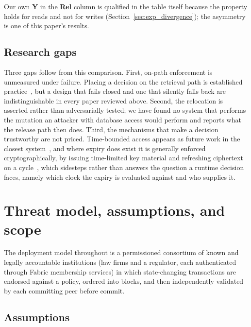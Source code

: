 \documentclass[preprint,12pt]{elsarticle}
\begin{document}
Our own \textbf{Y} in the \textbf{Rel} column is qualified in the table itself
because the property holds for reads and not for writes
(Section~\ref{sec:exp_divergence}); the asymmetry is one of this paper's
results.

\subsection{Research gaps}
\label{sec:gaps}

Three gaps follow from this comparison. First, on-path enforcement is
unmeasured under failure. Placing a decision on the retrieval path is
established practice~\cite{steichen2018blockchain,liu2026rbacipfs}, but a
design that fails closed and one that silently falls back are indistinguishable
in every paper reviewed above. Second, the relocation is asserted rather than
adversarially tested; we have found no system that performs the mutation an
attacker with database access would perform and reports what the release path
then does. Third, the mechanisms that make a decision trustworthy are not
priced. Time-bounded access appears as future work in the closest
system~\cite{liu2026rbacipfs}, and where expiry does exist it is generally
enforced cryptographically, by issuing time-limited key material and refreshing
ciphertext on a cycle~\cite{cai2023timebound}, which sidesteps rather than
answers the question a runtime decision faces, namely which clock the expiry is
evaluated against and who supplies it.


\section{Threat model, assumptions, and scope}
\label{sec:threat_model}

The deployment model throughout is a permissioned consortium of
known and legally accountable institutions (law firms and a regulator, each
authenticated through Fabric membership services) in which state-changing
transactions are endorsed against a policy, ordered into blocks, and then
independently validated by each committing peer before commit.

\subsection{Assumptions}
\label{sec:assumptions}
\end{document}
